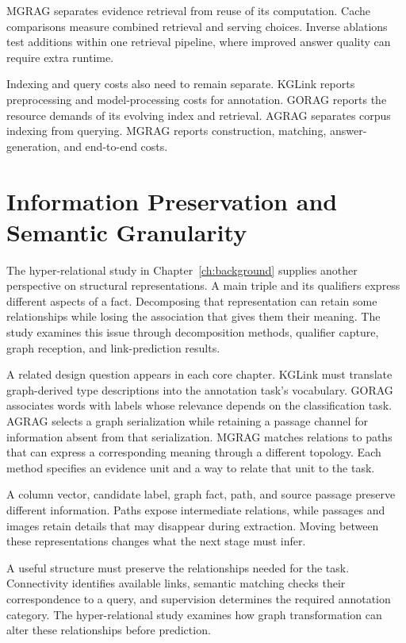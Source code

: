 MGRAG separates evidence retrieval from reuse of its computation. Cache comparisons measure combined retrieval and serving choices. Inverse ablations test additions within one retrieval pipeline, where improved answer quality can require extra runtime.

Indexing and query costs also need to remain separate. KGLink reports preprocessing and model-processing costs for annotation. GORAG reports the resource demands of its evolving index and retrieval. AGRAG separates corpus indexing from querying. MGRAG reports construction, matching, answer-generation, and end-to-end costs.

\section{Information Preservation and Semantic Granularity}
\label{sec:discussion:preservation}
The hyper-relational study in Chapter~\ref{ch:background} supplies another perspective on structural representations. A main triple and its qualifiers express different aspects of a fact. Decomposing that representation can retain some relationships while losing the association that gives them their meaning. The study examines this issue through decomposition methods, qualifier capture, graph reception, and link-prediction results.

A related design question appears in each core chapter. KGLink must translate graph-derived type descriptions into the annotation task's vocabulary. GORAG associates words with labels whose relevance depends on the classification task. AGRAG selects a graph serialization while retaining a passage channel for information absent from that serialization. MGRAG matches relations to paths that can express a corresponding meaning through a different topology. Each method specifies an evidence unit and a way to relate that unit to the task.

A column vector, candidate label, graph fact, path, and source passage preserve different information. Paths expose intermediate relations, while passages and images retain details that may disappear during extraction. Moving between these representations changes what the next stage must infer.

A useful structure must preserve the relationships needed for the task. Connectivity identifies available links, semantic matching checks their correspondence to a query, and supervision determines the required annotation category. The hyper-relational study examines how graph transformation can alter these relationships before prediction.

